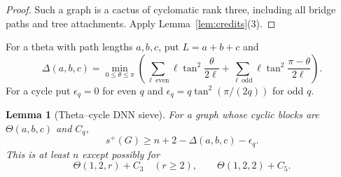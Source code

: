 \documentclass[11pt]{article}
\newtheorem{lemma}[theorem]{Lemma}
\theoremstyle{remark}
\newcommand{\splus}{s^+}
\begin{document}
\begin{proof}
Such a graph is a cactus of cyclomatic rank three, including all bridge paths
and tree attachments.  Apply Lemma~\ref{lem:credits}(3).
\end{proof}

For a theta with path lengths $a,b,c$, put $L=a+b+c$ and
\begin{equation}\label{eq:Delta}
 \Delta(a,b,c)=\min_{0\leq\theta\leq\pi}
 \left(\sum_{\ell\ \mathrm{even}}\ell\tan^2\frac{\theta}{2\ell}
 +\sum_{\ell\ \mathrm{odd}}\ell\tan^2\frac{\pi-\theta}{2\ell}\right).
\end{equation}
For a cycle put $\epsilon_q=0$ for even $q$ and
$\epsilon_q=q\tan^2(\pi/(2q))$ for odd $q$.

\begin{lemma}[Theta--cycle DNN sieve]\label{lem:21sieve}
For a graph whose cyclic blocks are $\Theta(a,b,c)$ and $C_q$,
\[
 \splus(G)\geq n+2-\Delta(a,b,c)-\epsilon_q.
\]
This is at least $n$ except possibly for
\[
 \Theta(1,2,r)+C_3\quad(r\geq2),
 \qquad \Theta(1,2,2)+C_5.
\]
\end{lemma}
\end{document}
